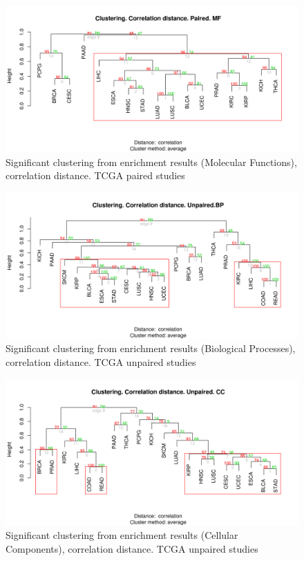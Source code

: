 \documentclass[a4paper,12pt]{article}
\begin{document}
\begin{figure}[!h] 
\centering 
\includegraphics[width=1\textwidth]{img/sigcluster_corelationd_mf_paired.png} 
\caption{Significant clustering from enrichment results (Molecular Functions), correlation distance.  TCGA paired studies} 
\label{figCLUSTsig_corr_mf_paired} 
\end{figure} 



\begin{figure}[!h] 
\centering 
\includegraphics[width=1\textwidth]{img/sigcluster_corelationd_bp_unpaired.png} 
\caption{Significant clustering from enrichment results (Biological Processes), correlation distance.  TCGA unpaired studies} 
\label{figCLUSTsig_corr_bp_unpaired} 
\end{figure} 

\begin{figure}[!h] 
\centering 
\includegraphics[width=1\textwidth]{img/sigcluster_corelationd_cc_unpaired.png} 
\caption{Significant clustering from enrichment results (Cellular Components), correlation distance.  TCGA unpaired studies} 
\label{figCLUSTsig_corr_cc_unpaired} 
\end{figure} 
\end{document}
